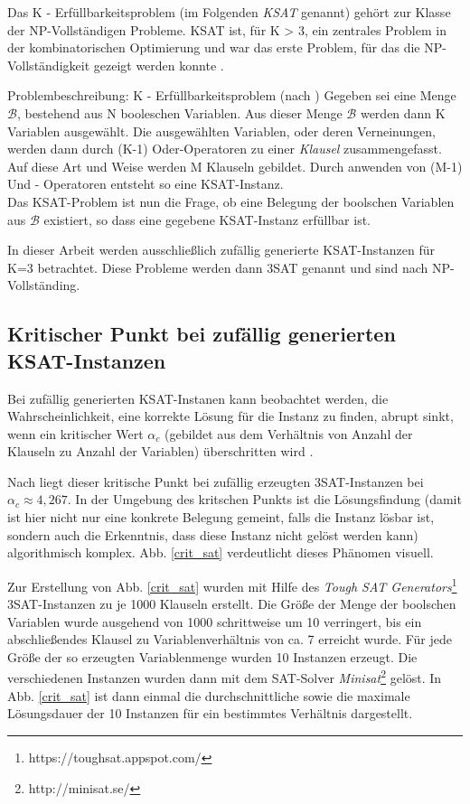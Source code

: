 \documentclass[runningheads]{llncs}
\begin{document}
Das K - Erfüllbarkeitsproblem (im Folgenden\emph{ KSAT} genannt) gehört zur Klasse der NP-Vollständigen Probleme. KSAT ist, für K > 3, ein zentrales Problem in der kombinatorischen Optimierung und war das erste Problem, für das die NP-Vollständigkeit gezeigt werden konnte \cite{mezard2002random}.

Problembeschreibung: K - Erfüllbarkeitsproblem (nach  \cite{mezard2002random})
Gegeben sei eine Menge $\mathcal{B}$, bestehend aus N booleschen Variablen. Aus dieser Menge $\mathcal{B}$ werden dann K Variablen ausgewählt. Die ausgewählten Variablen, oder deren Verneinungen, werden dann durch (K-1) Oder-Operatoren zu einer \emph {Klausel} zusammengefasst. Auf diese Art und Weise werden M Klauseln gebildet. Durch anwenden von (M-1) Und - Operatoren entsteht so eine KSAT-Instanz.\\Das KSAT-Problem ist nun die Frage, ob eine Belegung der boolschen Variablen aus $\mathcal{B}$ existiert, so dass eine gegebene KSAT-Instanz erfüllbar ist.

In dieser Arbeit werden ausschließlich zufällig generierte KSAT-Instanzen für K=3 betrachtet. Diese Probleme werden dann 3SAT genannt und sind nach \cite{cook1971complexity} NP-Vollständing.

\subsection{Kritischer Punkt bei zufällig generierten KSAT-Instanzen}\label{krit:sat}
Bei zufällig generierten KSAT-Instanen kann beobachtet werden, die Wahrscheinlichkeit, eine korrekte Lösung für die Instanz zu finden, abrupt sinkt, wenn ein kritischer Wert $\alpha_{c}$ (gebildet aus dem Verhältnis von Anzahl der Klauseln zu Anzahl der Variablen) überschritten wird \cite{monasson1996entropy}.

Nach \cite{mezard2002random} liegt dieser kritische Punkt bei zufällig erzeugten 3SAT-Instanzen bei \\$\alpha_{c} \approx 4,267$. In der Umgebung des kritschen Punkts ist die Lösungsfindung (damit ist hier nicht nur eine konkrete Belegung gemeint, falls die Instanz lösbar ist, sondern auch die Erkenntnis, dass diese Instanz nicht gelöst werden kann) algorithmisch komplex. Abb. \ref{crit_sat} verdeutlicht dieses Phänomen visuell.

Zur Erstellung von Abb. \ref{crit_sat} wurden mit Hilfe des \emph{Tough SAT Generators}\footnote{https://toughsat.appspot.com/} 3SAT-Instanzen zu je 1000 Klauseln erstellt. Die Größe der  Menge der boolschen Variablen wurde ausgehend von 1000 schrittweise um 10 verringert, bis ein abschließendes Klausel zu Variablenverhältnis von ca. 7 erreicht wurde. Für jede Größe der so erzeugten Variablenmenge wurden 10 Instanzen erzeugt. Die verschiedenen Instanzen wurden dann mit dem SAT-Solver \emph{Minisat}\footnote{http://minisat.se/} gelöst. In Abb. \ref{crit_sat} ist dann einmal die durchschnittliche sowie die maximale Lösungsdauer der 10 Instanzen für ein bestimmtes Verhältnis dargestellt.
\end{document}
